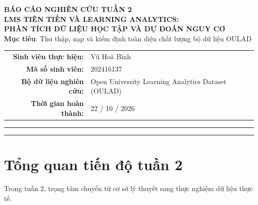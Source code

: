 \documentclass[11pt,a4paper]{article}
\begin{document}
\begin{center}
    
    {\Large \textbf{BÁO CÁO NGHIÊN CỨU TUẦN 2}}\\[0.4cm]
    {\LARGE \textbf{LMS TIÊN TIẾN VÀ LEARNING ANALYTICS:\\[0.2cm] PHÂN TÍCH DỮ LIỆU HỌC TẬP VÀ DỰ ĐOÁN NGUY CƠ}}\\[0.6cm]
    
    {\normalsize \textbf{Mục tiêu}: Thu thập, nạp và kiểm định toàn diện chất lượng bộ dữ liệu OULAD}\\[1cm]
    
    \begin{tabular}{rl}
        \textbf{Sinh viên thực hiện:} & Vũ Hoà Bình \\
        \textbf{Mã số sinh viên:} & 202416137 \\
        \textbf{Bộ dữ liệu nghiên cứu:} & Open University Learning Analytics Dataset (OULAD) \\
        \textbf{Thời gian hoàn thành:} & 22 / 10 / 2026 \\
    \end{tabular}
\end{center}

\vspace{0.8cm}
\hrule
\vspace{0.5cm}

\tableofcontents
\vspace{0.5cm}
\hrule
\vspace{0.8cm}

\newpage

\section{Tổng quan tiến độ tuần 2}

Trong tuần 2, trọng tâm chuyển từ cơ sở lý thuyết sang thực nghiệm dữ liệu thực tế.
\end{document}
